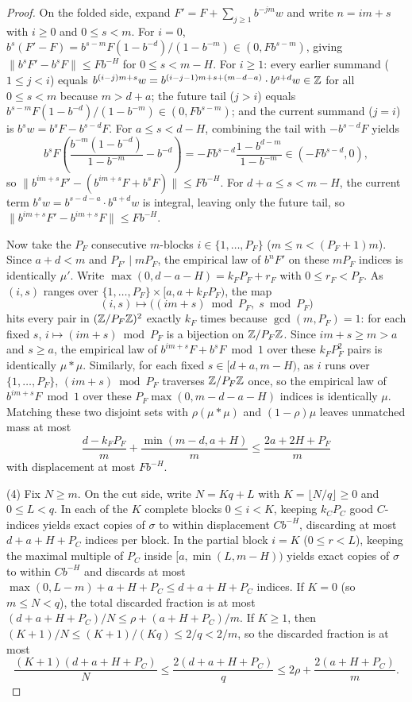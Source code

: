 \documentclass[11pt]{article}
\newcommand{\dist}[1]{\lVert #1\rVert}
\begin{document}
\begin{proof}
On the folded side, expand $F'=F+\sum_{j\ge1}b^{-jm}w$ and write $n=im+s$ with $i\ge0$ and $0\le s<m$. For $i=0$, $b^s(F'-F)=b^{s-m}F(1-b^{-d})/(1-b^{-m})\in(0,Fb^{s-m})$, giving $\dist{b^sF'-b^sF}\le Fb^{-H}$ for $0\le s<m-H$. For $i\ge1$: every earlier summand ($1\le j<i$) equals $b^{(i-j)m+s}w=b^{(i-j-1)m+s+(m-d-a)}\cdot b^{a+d}w\in\mathbb Z$ for all $0\le s<m$ because $m>d+a$; the future tail ($j>i$) equals $b^{s-m}F(1-b^{-d})/(1-b^{-m})\in(0,Fb^{s-m})$; and the current summand ($j=i$) is $b^sw=b^sF-b^{s-d}F$. For $a\le s<d-H$, combining the tail with $-b^{s-d}F$ yields
\[
b^sF\left(\frac{b^{-m}(1-b^{-d})}{1-b^{-m}}-b^{-d}\right)=-Fb^{s-d}\frac{1-b^{d-m}}{1-b^{-m}}\in(-Fb^{s-d},0),
\]
so $\dist{b^{im+s}F'-(b^{im+s}F+b^sF)}\le Fb^{-H}$. For $d+a\le s<m-H$, the current term $b^sw=b^{s-d-a}\cdot b^{a+d}w$ is integral, leaving only the future tail, so $\dist{b^{im+s}F'-b^{im+s}F}\le Fb^{-H}$.

Now take the $P_F$ consecutive $m$-blocks $i\in\{1,\dots,P_F\}$ ($m\le n<(P_F+1)m$). Since $a+d<m$ and $P_{F'}\mid mP_F$, the empirical law of $b^nF'$ on these $mP_F$ indices is identically $\mu'$. Write $\max(0,d-a-H)=k_FP_F+r_F$ with $0\le r_F<P_F$. As $(i,s)$ ranges over $\{1,\dots,P_F\}\times[a,a+k_FP_F)$, the map
\[
(i,s)\longmapsto\bigl((im+s)\bmod P_F,\; s\bmod P_F\bigr)
\]
hits every pair in $(\mathbb Z/P_F\mathbb Z)^2$ exactly $k_F$ times because $\gcd(m,P_F)=1$: for each fixed $s$, $i\mapsto(im+s)\bmod P_F$ is a bijection on $\mathbb Z/P_F\mathbb Z$. Since $im+s\ge m>a$ and $s\ge a$, the empirical law of $b^{im+s}F+b^sF\bmod1$ over these $k_FP_F^2$ pairs is identically $\mu*\mu$. Similarly, for each fixed $s\in[d+a,m-H)$, as $i$ runs over $\{1,\dots,P_F\}$, $(im+s)\bmod P_F$ traverses $\mathbb Z/P_F\mathbb Z$ once, so the empirical law of $b^{im+s}F\bmod1$ over these $P_F\max(0,m-d-a-H)$ indices is identically $\mu$. Matching these two disjoint sets with $\rho(\mu*\mu)$ and $(1-\rho)\mu$ leaves unmatched mass at most
\[
\frac{d-k_FP_F}{m}+\frac{\min(m-d,a+H)}{m}\le\frac{2a+2H+P_F}{m}
\]
with displacement at most $Fb^{-H}$.

(4) Fix $N\ge m$. On the cut side, write $N=Kq+L$ with $K=\lfloor N/q\rfloor\ge0$ and $0\le L<q$. In each of the $K$ complete blocks $0\le i<K$, keeping $k_CP_C$ good $C$-indices yields exact copies of $\sigma$ to within displacement $Cb^{-H}$, discarding at most $d+a+H+P_C$ indices per block. In the partial block $i=K$ ($0\le r<L$), keeping the maximal multiple of $P_C$ inside $[a,\min(L,m-H))$ yields exact copies of $\sigma$ to within $Cb^{-H}$ and discards at most $\max(0,L-m)+a+H+P_C\le d+a+H+P_C$ indices. If $K=0$ (so $m\le N<q$), the total discarded fraction is at most $(d+a+H+P_C)/N\le\rho+(a+H+P_C)/m$. If $K\ge1$, then $(K+1)/N\le(K+1)/(Kq)\le 2/q<2/m$, so the discarded fraction is at most
\[
\frac{(K+1)(d+a+H+P_C)}{N}\le\frac{2(d+a+H+P_C)}{q}\le 2\rho+\frac{2(a+H+P_C)}{m}.
\]


\end{proof}
\end{document}
